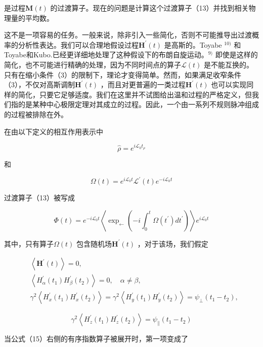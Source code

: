 \documentclass[10pt]{article}
\begin{document}
是过程\(\boldsymbol{M}(t)\) 的过渡算子。现在的问题是计算这个过渡算子（13）并找到相关物理量的平均数。

这不是一项容易的任务。一般来说，除非引入一些简化，否则不可能推导出过渡概率的分析性表达。我们可以合理地假设过程\(\boldsymbol{H}^{\prime}(t)\) 是高斯的。Toyabe \(^{10)}\) 和Toyabe和Kubo.已经更详细地处理了这种假设下的布朗自旋运动。\({ }^{9)}\) 即使是这样的简化，也不可能进行精确的处理，因为不同时间点的算子\(\mathcal{L}(t)\) 是不能互换的。只有在缩小条件（3）的限制下，理论才变得简单。然而，如果满足收窄条件（3），不仅对高斯调制\(\boldsymbol{H}^{\prime}(t)\) ，而且对更普遍的一类过程\(\boldsymbol{H}^{\prime}(t)\) 也可以实现同样的简化，只要它足够适度。我们在这里并不试图给出温和过程的严格定义，但我们指的是某种中心极限定理对其成立的过程。因此，一个由一系列不规则脉冲组成的过程被排除在外。

在由以下定义的相互作用表示中

\[
\hat{\rho}=e^{i \mathcal{L}_{0} t_{\rho}}
\] 

和

\[
\Omega(t)=e^{i \mathcal{L}_{0} t} \mathcal{L}^{\prime}(t) e^{-i \mathcal{L}_{0} t}
\] 

过渡算子（13）被写成

\[
\Phi(t)=e^{-i \mathcal{L}_{0} t}\left\langle\exp _{\leftarrow}\left(-i \int_{0}^{t} \Omega\left(t^{\prime}\right) d t^{\prime}\right)\right\rangle e^{i \mathcal{L}_{0} t}
\] 

其中，只有算子\(\Omega(t)\) 包含随机场\(\boldsymbol{H}^{\prime}(t)\) ，对于该场，我们假定

\[
\begin{aligned}
& \left\langle\boldsymbol{H}^{\prime}(t)\right\rangle=0, \\
& \left\langle H_{\alpha}^{\prime}\left(t_{1}\right) H_{\beta}^{\prime}\left(t_{2}\right)\right\rangle=0, \quad \alpha \neq \beta, \\
& \gamma^{2}\left\langle H_{x}^{\prime}\left(t_{1}\right) H_{x}^{\prime}\left(t_{2}\right)\right\rangle=\gamma^{2}\left\langle H_{y}^{\prime}\left(t_{1}\right) H_{y}^{\prime}\left(t_{2}\right)\right\rangle=\psi_{\perp}\left(t_{1}-t_{2}\right),
\end{aligned}
\] 

\[
\gamma^{2}\left\langle H_{z}^{\prime}\left(t_{1}\right) H_{z}^{\prime}\left(t_{2}\right)\right\rangle=\psi_{\|}\left(t_{1}-t_{2}\right)
\] 

当公式（15）右侧的有序指数算子被展开时，第一项变成了
\end{document}
